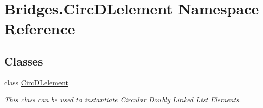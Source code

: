 \hypertarget{namespace_bridges_1_1_circ_d_lelement}{}\section{Bridges.\+Circ\+D\+Lelement Namespace Reference}
\label{namespace_bridges_1_1_circ_d_lelement}
\subsection*{Classes}
\begin{DoxyCompactItemize}
\item 
class \hyperlink{class_bridges_1_1_circ_d_lelement_1_1_circ_d_lelement}{Circ\+D\+Lelement}
\begin{DoxyCompactList}\small\item\em This class can be used to instantiate Circular Doubly Linked List Elements. \end{DoxyCompactList}\end{DoxyCompactItemize}
